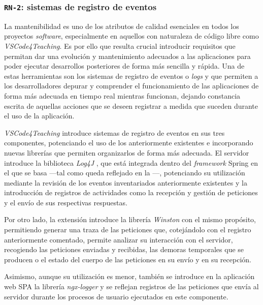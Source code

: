 \subsubsection{\texttt{RN-2}: sistemas de registro de eventos}
\label{subsec:rn2}

La mantenibilidad es uno de los atributos de calidad esenciales en todos los proyectos \textit{software}, especialmente en aquellos con naturaleza de código libre como \textit{VSCode4Teaching}. Es por ello que resulta crucial introducir requisitos que permitan dar una evolución y mantenimiento adecuados a las aplicaciones para poder ejecutar desarrollos posteriores de forma más sencilla y rápida. Una de estas herramientas son los sistemas de registro de eventos o \textit{logs} y que permiten a los desarrolladores depurar y comprender el funcionamiento de las aplicaciones de forma más adecuada en tiempo real mientras funcionan, dejando constancia escrita de aquellas acciones que se deseen registrar a medida que suceden durante el uso de la aplicación.

\textit{VSCode4Teaching} introduce sistemas de registro de eventos en sus tres componentes, potenciando el uso de los anteriormente existentes e incorporando nuevas librerías que permiten organizarlos de forma más adecuada. El servidor introduce la biblioteca \textit{Log4J} \cite{rn2_tecLogServidor}, que está integrada dentro del \textit{framework} Spring en el que se basa ---tal como queda reflejado en la ---, potenciando su utilización mediante la revisión de los eventos inventariados anteriormente existentes y la introducción de registros de actividades como la recepción y gestión de peticiones y el envío de sus respectivas respuestas.

Por otro lado, la extensión introduce la librería \textit{Winston} \cite{rn2_tecLogExtension} con el mismo propósito, permitiendo generar una traza de las peticiones que, cotejándolo con el registro anteriormente comentado, permite analizar su interacción con el servidor, recogiendo las peticiones enviadas y recibidas, las demoras temporales que se producen o el estado del cuerpo de las peticiones en su envío y en su recepción.

Asimismo, aunque su utilización es menor, también se introduce en la aplicación web SPA la librería \textit{ngx-logger} \cite{rn2_tecLogAppWeb} y se reflejan registros de las peticiones que envía al servidor durante los procesos de usuario ejecutados en este componente.
